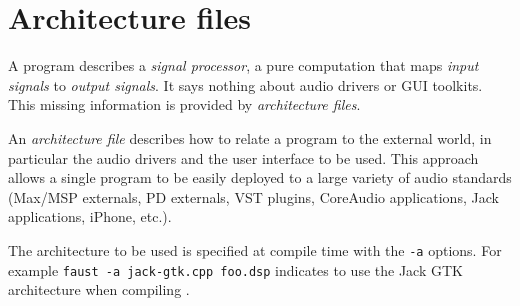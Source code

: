 \chapter{Architecture files} 
\label{Architectures}

A \faust program describes a \emph{signal processor}, a pure computation that maps \emph{input signals} to \emph{output signals}. It says nothing about audio drivers or GUI toolkits. This missing information is provided by \emph{architecture files}. 



An \emph{architecture file} describes how to relate a \faust program to the external world, in particular the audio drivers and the user interface to be used. This approach allows a single \faust program to be easily deployed to a large variety of audio standards (Max/MSP externals, PD externals, VST plugins, CoreAudio applications, Jack applications, iPhone, etc.). 

The architecture to be used is specified at compile time with the \lstinline'-a' options. For example
\lstinline'faust -a jack-gtk.cpp foo.dsp' indicates to use the Jack GTK architecture when compiling .


